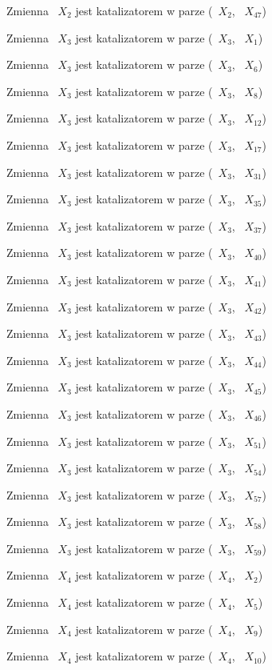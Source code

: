 \documentclass{article}
\begin{document}
Zmienna ~$X_{2}$ jest katalizatorem w parze (~$X_{2}$, ~$X_{47}$)

Zmienna ~$X_{3}$ jest katalizatorem w parze (~$X_{3}$, ~$X_{1}$)

Zmienna ~$X_{3}$ jest katalizatorem w parze (~$X_{3}$, ~$X_{6}$)

Zmienna ~$X_{3}$ jest katalizatorem w parze (~$X_{3}$, ~$X_{8}$)

Zmienna ~$X_{3}$ jest katalizatorem w parze (~$X_{3}$, ~$X_{12}$)

Zmienna ~$X_{3}$ jest katalizatorem w parze (~$X_{3}$, ~$X_{17}$)

Zmienna ~$X_{3}$ jest katalizatorem w parze (~$X_{3}$, ~$X_{31}$)

Zmienna ~$X_{3}$ jest katalizatorem w parze (~$X_{3}$, ~$X_{35}$)

Zmienna ~$X_{3}$ jest katalizatorem w parze (~$X_{3}$, ~$X_{37}$)

Zmienna ~$X_{3}$ jest katalizatorem w parze (~$X_{3}$, ~$X_{40}$)

Zmienna ~$X_{3}$ jest katalizatorem w parze (~$X_{3}$, ~$X_{41}$)

Zmienna ~$X_{3}$ jest katalizatorem w parze (~$X_{3}$, ~$X_{42}$)

Zmienna ~$X_{3}$ jest katalizatorem w parze (~$X_{3}$, ~$X_{43}$)

Zmienna ~$X_{3}$ jest katalizatorem w parze (~$X_{3}$, ~$X_{44}$)

Zmienna ~$X_{3}$ jest katalizatorem w parze (~$X_{3}$, ~$X_{45}$)

Zmienna ~$X_{3}$ jest katalizatorem w parze (~$X_{3}$, ~$X_{46}$)

Zmienna ~$X_{3}$ jest katalizatorem w parze (~$X_{3}$, ~$X_{51}$)

Zmienna ~$X_{3}$ jest katalizatorem w parze (~$X_{3}$, ~$X_{54}$)

Zmienna ~$X_{3}$ jest katalizatorem w parze (~$X_{3}$, ~$X_{57}$)

Zmienna ~$X_{3}$ jest katalizatorem w parze (~$X_{3}$, ~$X_{58}$)

Zmienna ~$X_{3}$ jest katalizatorem w parze (~$X_{3}$, ~$X_{59}$)

Zmienna ~$X_{4}$ jest katalizatorem w parze (~$X_{4}$, ~$X_{2}$)

Zmienna ~$X_{4}$ jest katalizatorem w parze (~$X_{4}$, ~$X_{5}$)

Zmienna ~$X_{4}$ jest katalizatorem w parze (~$X_{4}$, ~$X_{9}$)

Zmienna ~$X_{4}$ jest katalizatorem w parze (~$X_{4}$, ~$X_{10}$)
\end{document}
